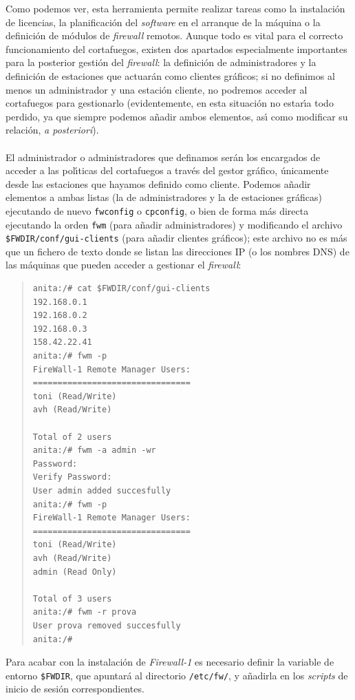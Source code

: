 Como podemos ver, esta herramienta permite realizar tareas como la 
instalaci\'on de licencias, la planificaci\'on del {\it software} en el 
arranque de la m\'aquina o la definici\'on de m\'odulos de {\it firewall} 
remotos. Aunque todo es 
vital para el correcto funcionamiento del cortafuegos, existen dos apartados 
especialmente importantes para la posterior gesti\'on del {\it firewall}: la
definici\'on de administradores y la definici\'on de estaciones que actuar\'an 
como clientes gr\'aficos; si no definimos al menos un administrador y una
estaci\'on cliente, no podremos acceder al cortafuegos para gestionarlo 
(evidentemente, en esta situaci\'on no estar\'{\i}a todo perdido, ya que siempre
podemos a\~nadir ambos elementos, as\'{\i} como modificar su relaci\'on, {\it a 
posteriori}).\\
\\El administrador o administradores que definamos ser\'an los encargados de 
acceder a las pol\'{\i}ticas del cortafuegos a trav\'es del gestor gr\'afico, 
\'unicamente desde las estaciones que hayamos definido como cliente. Podemos
a\~nadir elementos a ambas listas (la de administradores y la de estaciones 
gr\'aficas) ejecutando de nuevo {\tt fwconfig} o {\tt cpconfig}, o bien de forma
m\'as directa ejecutando la orden {\tt fwm} (para a\~nadir administradores) y
modificando el archivo {\tt \$FWDIR/conf/gui-clients} (para a\~nadir clientes
gr\'aficos); este archivo no es m\'as que un fichero de texto donde se listan
las direcciones IP (o los nombres DNS) de las m\'aquinas que pueden acceder
a gestionar el {\it firewall}:
\begin{quote}
\begin{verbatim}
anita:/# cat $FWDIR/conf/gui-clients
192.168.0.1
192.168.0.2
192.168.0.3
158.42.22.41
anita:/# fwm -p
FireWall-1 Remote Manager Users:
================================
toni (Read/Write)
avh (Read/Write)

Total of 2 users
anita:/# fwm -a admin -wr
Password:
Verify Password:
User admin added succesfully
anita:/# fwm -p
FireWall-1 Remote Manager Users:
================================
toni (Read/Write)
avh (Read/Write)
admin (Read Only)

Total of 3 users
anita:/# fwm -r prova
User prova removed succesfully
anita:/#
\end{verbatim}
\end{quote}
Para acabar con la instalaci\'on de {\it Firewall-1} es necesario definir la
variable de entorno {\tt \$FWDIR}, que apuntar\'a al directorio {\tt /etc/fw/},
y a\~nadirla en los {\it scripts} de inicio de sesi\'on correspondientes. 
